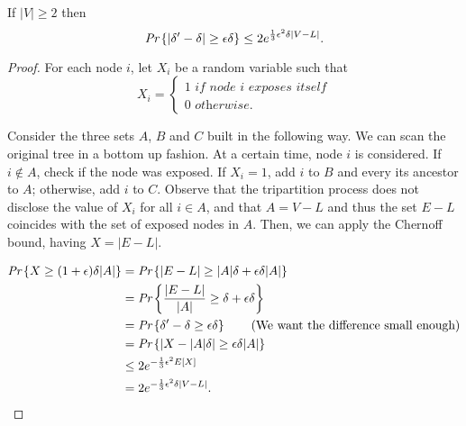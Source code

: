 \begin{lem}
	If $|V| \geq 2$ then
	\begin{equation}
	\emph{Pr}\left\{|\delta' - \delta| \geq \epsilon\delta\right\} \leq 2e^{\frac{1}{3}\epsilon^2\delta|V-L|}.
	\end{equation}
\end{lem}
\begin{proof}
	For each node $i$, let $X_i$ be a random variable such that
	\begin{equation}
		X_i = \begin{cases}
		1 \textit{ if node i exposes itself}\\
		0 \textit{ otherwise}.
		\end{cases}
	\end{equation}
	
	Consider the three sets $A$, $B$ and $C$ built in the following way. We can scan the original tree in a bottom up fashion. At a certain time, node $i$ is considered. If $i \not\in A$, check if the node was exposed. If $X_i = 1$, add $i$ to $B$ and every its ancestor to $A$; otherwise, add $i$ to $C$. 
	Observe that the tripartition process does not disclose the value of $X_i$ for all $i \in A$, and that $A = V - L$ and thus the set $E - L$ coincides with the set of exposed nodes in $A$. Then, we can apply the Chernoff bound, having $X = |E - L|$.
	
	\begin{align}
		\emph{Pr}\left\{X \geq (1 + \epsilon)\delta |A|\right\} &= \emph{Pr}\left\{|E - L| \geq |A|\delta + \epsilon\delta|A|\right\}\\
		&=\emph{Pr}\left\{\frac{|E - L|}{|A|} \geq \delta + \epsilon\delta\right\}\\
		&=\emph{Pr}\left\{\delta'-\delta \geq \epsilon\delta\right\} \tag{We want the difference small enough}\\
		&= \emph{Pr}\left\{|X - |A|\delta| \geq \epsilon\delta|A|\right\}\\
		&\leq 2e^{-\frac{1}{3}\epsilon^2E[X]}\\
		& = 2e^{-\frac{1}{3}\epsilon^2\delta|V-L|}.
		\end{align}	
\end{proof}

